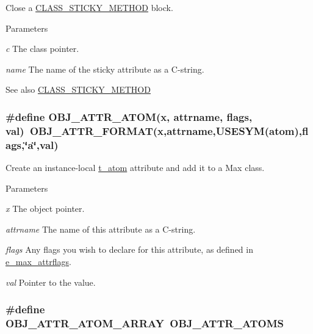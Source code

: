 Close a \hyperlink{group__attr_ga864386ce13dd707052d2fef6bc927576}{CLASS\_\-STICKY\_\-METHOD} block. 
\begin{DoxyParams}{Parameters}
\item[{\em c}]The class pointer. \item[{\em name}]The name of the sticky attribute as a C-\/string. \end{DoxyParams}
\begin{DoxySeeAlso}{See also}
\hyperlink{group__attr_ga864386ce13dd707052d2fef6bc927576}{CLASS\_\-STICKY\_\-METHOD} 
\end{DoxySeeAlso}
\hypertarget{group__attr_ga0db2095d20b842398b1f796c72e58dcb}{
\subsubsection[{OBJ\_\-ATTR\_\-ATOM}]{\setlength{\rightskip}{0pt plus 5cm}\#define OBJ\_\-ATTR\_\-ATOM(x, \/  attrname, \/  flags, \/  val)~OBJ\_\-ATTR\_\-FORMAT(x,attrname,USESYM(atom),flags,\char`\"{}a\char`\"{},val)}}
\label{group__attr_ga0db2095d20b842398b1f796c72e58dcb}


Create an instance-\/local \hyperlink{structt__atom}{t\_\-atom} attribute and add it to a Max class. 
\begin{DoxyParams}{Parameters}
\item[{\em x}]The object pointer. \item[{\em attrname}]The name of this attribute as a C-\/string. \item[{\em flags}]Any flags you wish to declare for this attribute, as defined in \hyperlink{group__attr_gaf296cfc6741bb19207f6ed8062809115}{e\_\-max\_\-attrflags}. \item[{\em val}]Pointer to the value. \end{DoxyParams}
\hypertarget{group__attr_ga63912314a2787b9e05d3c4f9915f567f}{
\subsubsection[{OBJ\_\-ATTR\_\-ATOM\_\-ARRAY}]{\setlength{\rightskip}{0pt plus 5cm}\#define OBJ\_\-ATTR\_\-ATOM\_\-ARRAY~OBJ\_\-ATTR\_\-ATOMS}}
\label{group__attr_ga63912314a2787b9e05d3c4f9915f567f}


